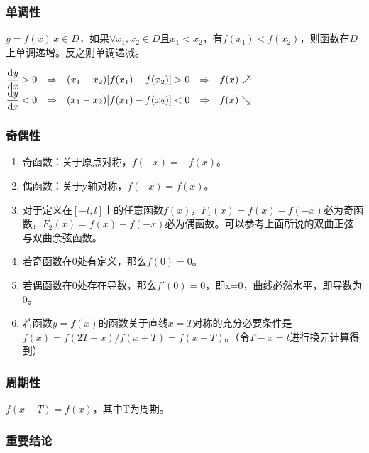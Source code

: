 \documentclass[UTF8, 12pt]{ctexart}
\begin{document}
\subsubsection{单调性}

$y=f(x)\,x\in D$，如果$\forall x_1,x_2\in D$且$x_1<x_2$，有$f(x_1)<f(x_2)$，则函数在$D$上单调递增。反之则单调递减。

\medskip

$\begin{matrix}
        \dfrac{\rm{d}\textit{y}}{\rm{d}\textit{x}}>0 & \Rightarrow & (x_1-x_2)[f(x_1)-f(x_2)]>0 & \Rightarrow & f(x)\nearrow \\
        \dfrac{\rm{d}\textit{y}}{\rm{d}\textit{x}}<0 & \Rightarrow & (x_1-x_2)[f(x_1)-f(x_2)]<0 & \Rightarrow & f(x)\searrow
    \end{matrix}
$

\subsubsection{奇偶性}

\begin{enumerate}
    \item 奇函数：关于原点对称，$f(-x)=-f(x)$。
    \item 偶函数：关于y轴对称，$f(-x)=f(x)$。
    \item 对于定义在$[-l,l]$上的任意函数$f(x)$，$F_1(x)=f(x)-f(-x)$必为奇函数，$F_2(x)=f(x)+f(-x)$必为偶函数。可以参考上面所说的双曲正弦与双曲余弦函数。
    \item 若奇函数在0处有定义，那么$f(0)=0$。
    \item 若偶函数在0处存在导数，那么$f'(0)=0$，即x=0，曲线必然水平，即导数为0。
    \item 若函数$y=f(x)$的函数关于直线$x=T$对称的充分必要条件是$f(x)=f(2T-x)/f(x+T)=f(x-T)$。（令$T-x=t$进行换元计算得到）
\end{enumerate}

\subsubsection{周期性}

$f(x+T)=f(x)$，其中T为周期。 \medskip

\subsubsection{重要结论}
\end{document}
